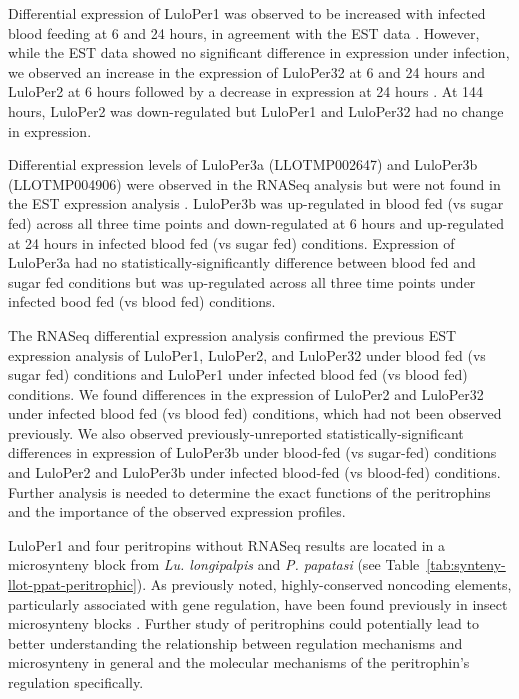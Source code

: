 Differential expression of LuloPer1 was observed to be increased with infected blood feeding at 6 and 24 hours, in agreement with the EST data \cite{Jochim2008,Dostalova2012}.  However, while the EST data showed no significant difference in expression under infection, we observed an increase in the expression of LuloPer32 at 6 and 24 hours and LuloPer2 at 6 hours followed by a decrease in expression at 24 hours \cite{Jochim2008}.  At 144 hours, LuloPer2 was down-regulated but LuloPer1 and LuloPer32 had no change in expression.

Differential expression levels of LuloPer3a (LLOTMP002647) and LuloPer3b (LLOTMP004906) were observed in the RNASeq analysis but were not found in the EST expression analysis \cite{Jochim2008}. LuloPer3b was up-regulated in blood fed (vs sugar fed) across all three time points and down-regulated at 6 hours and up-regulated at 24 hours in infected blood fed (vs sugar fed) conditions.  Expression of LuloPer3a had no statistically-significantly difference between blood fed and sugar fed conditions but was up-regulated across all three time points under infected bood fed (vs blood fed) conditions.

The RNASeq differential expression analysis confirmed the previous EST expression analysis of LuloPer1, LuloPer2, and LuloPer32 under blood fed (vs sugar fed) conditions and LuloPer1 under infected blood fed (vs blood fed) conditions.  We found differences in the expression of LuloPer2 and LuloPer32 under infected blood fed (vs blood fed) conditions, which had not been observed previously.  We also observed previously-unreported statistically-significant differences in expression of LuloPer3b under blood-fed (vs sugar-fed) conditions and LuloPer2 and LuloPer3b under infected blood-fed (vs blood-fed) conditions. Further analysis is needed to determine the exact functions of the peritrophins and the importance of the observed expression profiles.

LuloPer1 and four peritropins without RNASeq results are located in a microsynteny block from \emph{Lu. longipalpis} and \emph{P. papatasi} (see Table~\ref{tab:synteny-llot-ppat-peritrophic}). As previously noted, highly-conserved noncoding elements, particularly associated with gene regulation, have been found previously in insect microsynteny blocks \cite{Engstrom2007}.  Further study of peritrophins could potentially lead to  better understanding the relationship between regulation mechanisms and microsynteny in general and the molecular mechanisms of the peritrophin's regulation specifically.

